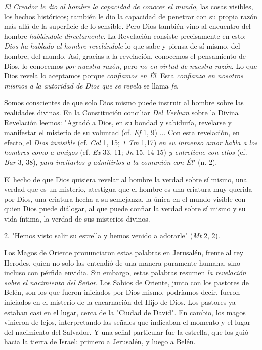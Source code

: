 \begin{body}
\emph{El Creador le dio al hombre la capacidad de conocer el mundo}, las cosas visibles, los hechos históricos; también le dio la capacidad de penetrar con su propia razón más allá de la superficie de lo sensible. Pero Dios también vino al encuentro del hombre \emph{hablándole directamente}. La Revelación consiste precisamente en esto: \emph{Dios ha hablado al hombre revelándole} lo que sabe y piensa de sí mismo, del hombre, del mundo. Así, gracias a la revelación, conocemos el pensamiento de Dios, lo conocemos \emph{por nuestra razón}, pero \emph{no en virtud de nuestra razón}. Lo que Dios revela lo aceptamos porque \emph{confiamos en Él}. Esta \emph{confianza en nosotros mismos a la autoridad de Dios que se revela} se llama \emph{fe}.

Somos conscientes de que solo Dios mismo puede instruir al hombre sobre las realidades divinas. En la Constitución conciliar \emph{Del Verbum} sobre la Divina Revelación leemos: "Agradó a Dios, en su bondad y sabiduría, revelarse y manifestar el misterio de su voluntad (cf. \emph{Ef} 1, 9) ... Con esta revelación, en efecto, el \emph{Dios invisible} (cf. \emph{Col} 1, 15; \emph{1 Tm} 1,17) \emph{en su inmenso amor habla a los hombres como a amigos} (cf. \emph{Ex} 33, 11; \emph{Jn} 15, 14-15) \emph{y entretiene con ellos} (cf. \emph{Bar} 3, 38), \emph{para invitarlos y admitirlos a la comunión con Él}" (n. 2).

El hecho de que Dios quisiera revelar al hombre la verdad sobre sí mismo, una verdad que es un misterio, atestigua que el hombre es una criatura muy querida por Dios, una criatura hecha a su semejanza, la única en el mundo visible con quien Dios puede diálogar, al que puede confiar la verdad sobre sí mismo y su vida íntima, la verdad de sus misterios divinos.

2. "Hemos visto salir su estrella y hemos venido a adorarle" (\emph{Mt} 2, 2).

Los Magos de Oriente pronunciaron estas palabras en Jerusalén, frente al rey Herodes, quien no solo las entendió de una manera puramente humana, sino incluso con pérfida envidia. Sin embargo, estas palabras resumen \emph{la revelación sobre el nacimiento del Señor}. Los Sabios de Oriente, junto con los pastores de Belén, son los que fueron iniciados por Dios mismo, podríamos decir, fueron iniciados en el misterio de la encarnación del Hijo de Dios. Los pastores ya estaban casi en el lugar, cerca de la "Ciudad de David". En cambio, los magos vinieron de lejos, interpretando las señales que indicaban el momento y el lugar del nacimiento del Salvador. Y una señal particular fue la estrella, que los guió hacia la tierra de Israel: primero a Jerusalén, y luego a Belén.


\end{body}
